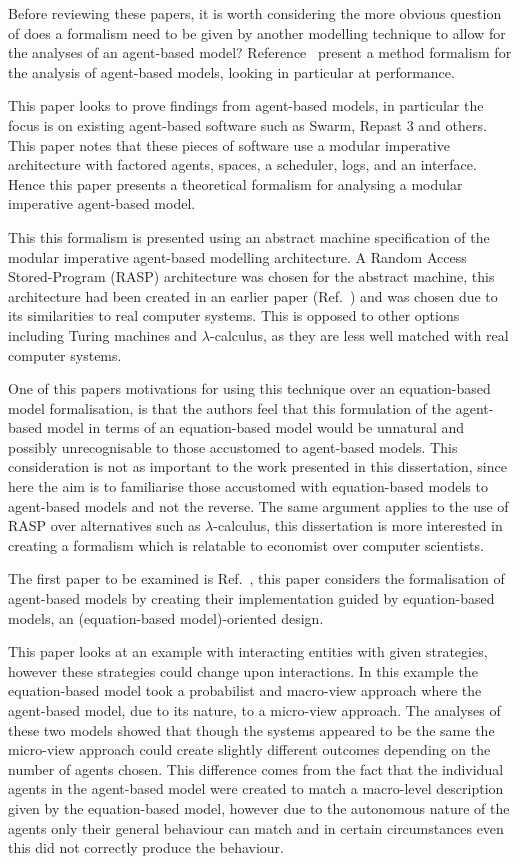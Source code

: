 \documentclass{article}
\begin{document}
Before reviewing these papers, it is worth considering the more obvious question of does a formalism need to be given by another modelling technique to allow for the analyses of an agent-based model? Reference~\cite{taabm} present a method formalism for the analysis of agent-based models, looking in particular at performance. 

This paper looks to prove findings from agent-based models, in particular the focus is on existing agent-based software such as Swarm, Repast 3 and others. This paper notes that these pieces of software use a modular imperative architecture with factored agents, spaces, a scheduler, logs, and an interface. Hence this paper presents a theoretical formalism for analysing a modular imperative agent-based model.    

This this formalism is presented using an abstract machine specification of the modular imperative agent-based modelling architecture. A  Random Access Stored-Program (RASP) architecture was chosen for the abstract machine, this architecture had been created in an earlier paper (Ref.~\cite{raspceated}) and was chosen due to its similarities to real computer systems. This is opposed to other options including Turing machines and $\lambda$-calculus, as they are less well matched with real computer systems.     

One of this papers motivations for using this technique over an equation-based model formalisation, is that the authors feel that this formulation of the agent-based model in terms of an equation-based model would be unnatural and possibly unrecognisable to those accustomed to agent-based models. This consideration is not as important to the work presented in this dissertation, since here the aim is to familiarise those accustomed with equation-based models to agent-based models and not the reverse. The same argument applies to the use of RASP over alternatives such as $\lambda$-calculus, this dissertation is more interested in creating a formalism which is relatable to economist over computer scientists.   

The first paper to be examined is Ref.~\cite{ebmabmi}, this paper considers the formalisation of agent-based models by creating their implementation guided by equation-based models, an (equation-based model)-oriented design.  

This paper looks at an example with interacting entities with given strategies, however these strategies could change upon interactions. In this example the equation-based model took a probabilist and macro-view approach where the agent-based model, due to its nature, to a micro-view approach. The analyses of these two models showed that though the systems appeared to be the same the micro-view approach could create slightly different outcomes depending on the number of agents chosen. This difference comes from the fact that the individual agents in the agent-based model were created to match a macro-level description given by the equation-based model, however due to the autonomous nature of the agents only their general behaviour can match and in certain circumstances even this did not correctly produce the behaviour.
\end{document}
